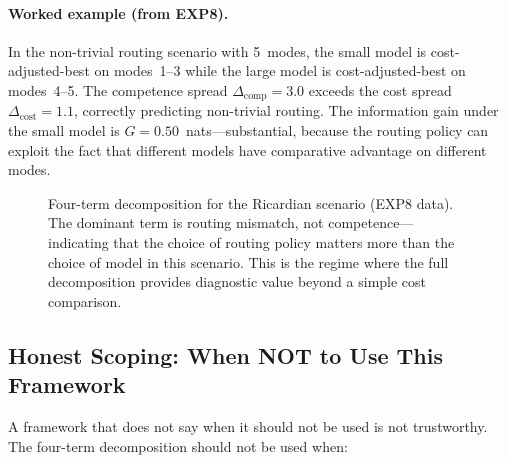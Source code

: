 \paragraph{Worked example (from EXP8).}
In the non-trivial routing scenario with 5~modes, the small model is cost-adjusted-best on modes~1--3 while the large model is cost-adjusted-best on modes~4--5.
The competence spread $\Delta_{\mathrm{comp}} = 3.0$ exceeds the cost spread $\Delta_{\mathrm{cost}} = 1.1$, correctly predicting non-trivial routing.
The information gain under the small model is $G = 0.50$~nats---substantial, because the routing policy can exploit the fact that different models have comparative advantage on different modes.

\begin{figure}[t]
  \centering
  \caption{Four-term decomposition for the Ricardian scenario (EXP8 data).
  The dominant term is routing mismatch, not competence---indicating that the choice of routing policy matters more than the choice of model in this scenario.
  This is the regime where the full decomposition provides diagnostic value beyond a simple cost comparison.}
  \label{fig:four-term-bar}
\end{figure}

\subsection{Honest Scoping: When NOT to Use This Framework}
\label{sec:scoping}

A framework that does not say when it should not be used is not trustworthy.
The four-term decomposition should not be used when:

